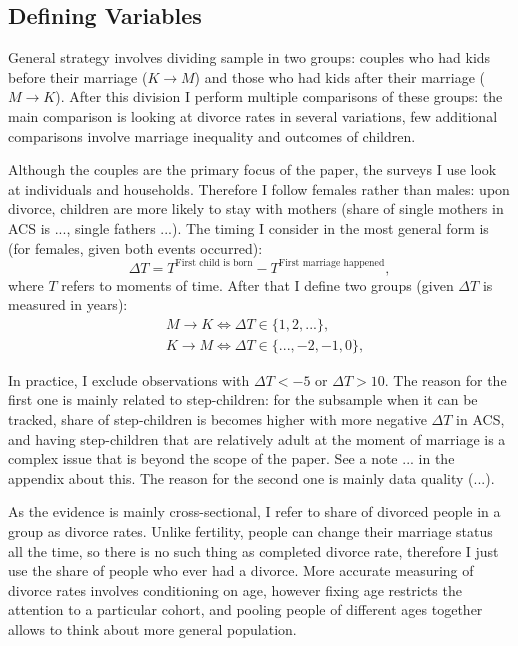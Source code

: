 \documentclass[12pt,letter]{article}
\begin{document}
\subsection{Defining Variables}

General strategy involves dividing sample in two groups: couples who had kids before their marriage ($K\to M$) and those who had kids after their marriage ($M\to K$). After this division I perform multiple comparisons of these groups: the main comparison is looking at divorce rates in several variations, few additional comparisons involve marriage inequality and outcomes of children.

Although the couples are the primary focus of the paper, the surveys I use look at individuals and households. Therefore I follow females rather than males: upon divorce, children are more likely to stay with mothers (share of single mothers in ACS is ..., single fathers ...). The timing I consider in the  most general form is (for females, given both events occurred): 
\[\Delta T = T^{\text{First child  is born}} - T^{\text{First marriage happened}},\]
where $T$ refers to moments of time. After that I define two groups (given $\Delta T$ is measured in years):
\begin{align*}&M\to K \Leftrightarrow \Delta T \in \{1,2,...\},\\
&K\to M \Leftrightarrow \Delta T \in \{...,-2,-1,0\},\end{align*}

In practice, I exclude observations with $\Delta T < -5$ or $\Delta T > 10$. The reason for the first one is mainly related to step-children: for the subsample when it can be tracked, share of step-children is becomes higher with more negative $\Delta  T$ in ACS, and having step-children that are relatively adult at the moment of marriage is a complex issue that is beyond the scope of the paper. See a note ... in the appendix about this. The reason for the second one is mainly data quality (...).

As the evidence is mainly cross-sectional, I refer to share of divorced people in a group as divorce rates. Unlike fertility, people can change their marriage status all the time, so there is no such thing as completed divorce rate, therefore I just use the share of people who ever had a divorce. More accurate measuring of divorce rates involves conditioning on age, however fixing age restricts the attention to a particular cohort, and pooling people of different ages together allows to think about more general population.
\end{document}
